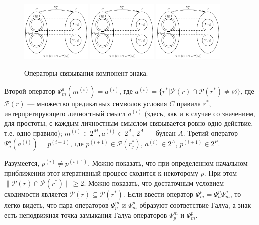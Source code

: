 \documentclass[12pt]{scrartcl}
\begin{document}
	\begin{figure}[H]
		\label{fig:linkers}
		\centering
		\includegraphics[width=0.3\textwidth,page=1]{sign-schemas/oper_relat}
		\includegraphics[width=0.3\textwidth,page=2]{sign-schemas/oper_relat}
		\includegraphics[width=0.3\textwidth,page=3]{sign-schemas/oper_relat}
		\caption{Операторы связывания компонент знака.}		
	\end{figure}
	
	Второй оператор	$\Psi_m^a(m^{(i)})=a^{(i)}$, где $a^{(i)}=\{r^*|\mathcal{P}(r)\cap \mathcal{P}(r^*)\not=\varnothing\}$, где $\mathcal{P}(r)$ --- множество предикатных символов условия $C$ правила $r^*$, интерпретирующего личностный смысл $a^{(i)}$ (здесь, как и в случае со значением, для простоты, с каждым личностным смыслом связывается ровно одно действие, т.е. одно правило); $m^{(i)}\in 2^M, a^{(i)}\in 2^A$, $2^A$ --- булеан $A$. Третий оператор $\Psi_a^p(a^{(i)})=p^{(i+1)}$, где $p^{(i+1)}\in \mathcal{P}(r_j^*)$, $a^{(i)}\in 2^A$, $p^{(i+1)}\in 2^P$.
	
	Разумеется, $p^{(i)}\not = p^{(i+1)}$. Можно показать, что при определенном начальном приближении этот итеративный процесс сходится к некоторому $p$. При этом $\|\mathcal P(r)\cap\mathcal P(r^*)\|\geq 2$. Можно показать, что достаточным условием сходимости является $\mathcal P(r)\subseteq\mathcal P(r^*)$. Если ввести оператор $\Psi_m^p=\Psi_a^p\Psi_m^a$, то легко видеть, что пара операторов $\Psi_p^m$ и $\Psi_m^p$ образуют соответствие Галуа, а знак есть неподвижная точка замыкания Галуа операторов $\Psi_p^m$ и $\Psi_m^p$.
	
\end{document}
